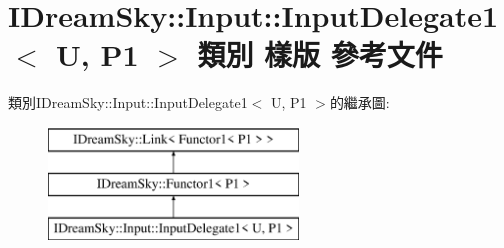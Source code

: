 \hypertarget{class_i_dream_sky_1_1_input_1_1_input_delegate1}{}\section{I\+Dream\+Sky\+:\+:Input\+:\+:Input\+Delegate1$<$ U, P1 $>$ 類別 樣版 參考文件}
\label{class_i_dream_sky_1_1_input_1_1_input_delegate1}
類別\+I\+Dream\+Sky\+:\+:Input\+:\+:Input\+Delegate1$<$ U, P1 $>$的繼承圖\+:\begin{figure}[H]
\begin{center}
\leavevmode
\includegraphics[height=3.000000cm]{class_i_dream_sky_1_1_input_1_1_input_delegate1}
\end{center}
\end{figure}
